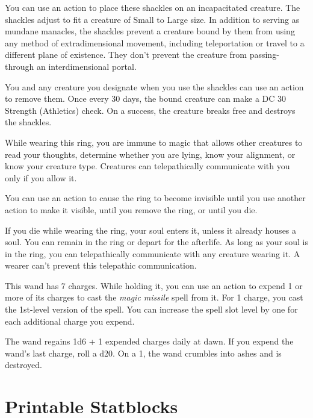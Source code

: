 \documentclass[10pt,a4paper,twoside,bg=print,twocolumn,openany,nodeprecatedcode]{dndarticle}
\begin{document}
You can use an action to place these shackles on an incapacitated creature. The shackles adjust to fit a creature of Small to Large size. In addition to serving as mundane manacles, the shackles prevent a creature bound by them from using any method of extradimensional movement, including teleportation or travel to a different plane of existence. They don't prevent the creature from passing-through an interdimensional portal.

You and any creature you designate when you use the shackles can use an action to remove them. Once every 30 days, the bound creature can make a DC 30 Strength (Athletics) check. On a success, the creature breaks free and destroys the shackles.

While wearing this ring, you are immune to magic that allows other creatures to read your thoughts, determine whether you are lying, know your alignment, or know your creature type. Creatures can telepathically communicate with you only if you allow it.

You can use an action to cause the ring to become invisible until you use another action to make it visible, until you remove the ring, or until you die.

If you die while wearing the ring, your soul enters it, unless it already houses a soul. You can remain in the ring or depart for the afterlife. As long as your soul is in the ring, you can telepathically communicate with any creature wearing it. A wearer can't prevent this telepathic communication.

This wand has 7 charges. While holding it, you can use an action to expend 1 or more of its charges to cast the \textit{magic missile} spell from it. For 1 charge, you cast the 1st-level version of the spell. You can increase the spell slot level by one for each additional charge you expend.

The wand regains 1d6 + 1 expended charges daily at dawn. If you expend the wand's last charge, roll a d20. On a 1, the wand crumbles into ashes and is destroyed.

\part*{Printable Statblocks}
\pagestyle{empty}
\end{document}
